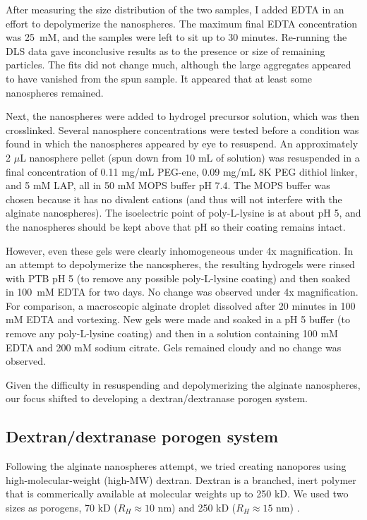 After measuring the size distribution of the two samples, I added EDTA in an effort to depolymerize the nanospheres.  The maximum final EDTA concentration was 25~mM, and the samples were left to sit up to 30 minutes.  Re-running the DLS data gave inconclusive results as to the presence or size of remaining particles.  The fits did not change much, although the large aggregates appeared to have vanished from the spun sample.  It appeared that at least some nanospheres remained.

Next, the nanospheres were added to hydrogel precursor solution, which was then crosslinked.  Several nanosphere concentrations were tested before a condition was found in which the nanospheres appeared by eye to resuspend.  An approximately 2 $\mu$L nanosphere pellet (spun down from 10 mL of solution) was resuspended in a final concentration of 0.11 mg/mL PEG-ene, 0.09 mg/mL 8K PEG dithiol linker, and 5 mM LAP, all in 50 mM MOPS buffer pH 7.4.  The MOPS buffer was chosen because it has no divalent cations (and thus will not interfere with the alginate nanospheres).  The isoelectric point of poly-L-lysine is at about pH 5, and the nanospheres should be kept above that pH so their coating remains intact.

However, even these gels were clearly inhomogeneous under 4x magnification.  In an attempt to depolymerize the nanospheres, the resulting hydrogels were rinsed with PTB pH 5 (to remove any possible poly-L-lysine coating) and then soaked in 100~mM EDTA for two days.  No change was observed under 4x magnification.  For comparison, a macroscopic alginate droplet dissolved after 20 minutes in 100 mM EDTA and vortexing.  New gels were made and soaked in a pH 5 buffer (to remove any poly-L-lysine coating) and then in a solution containing 100 mM EDTA and 200 mM sodium citrate.  Gels remained cloudy and no change was observed.

Given the difficulty in resuspending and depolymerizing the alginate nanospheres, our focus shifted to developing a dextran/dextranase porogen system.

\subsection{Dextran/dextranase porogen system}
Following the alginate nanospheres attempt, we tried creating nanopores using high-molecular-weight (high-MW) dextran.  Dextran is a branched, inert polymer that is commerically available at molecular weights up to 250 kD.  We used two sizes as porogens, 70 kD ($R_H \approx 10$ nm) and 250 kD ($R_H \approx 15$ nm) \cite{masuelli13}.  

